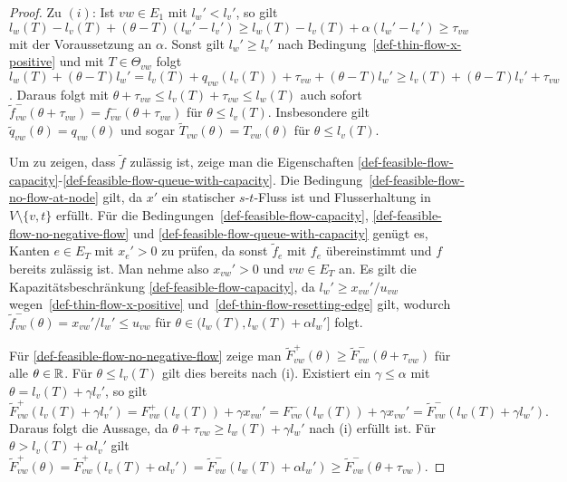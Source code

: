 \begin{proof}
	Zu $(i)$: Ist $vw\in E_1$ mit $l_w'<l_v'$, so gilt
	$l_w(T)-l_v(T) + (\theta - T)(l_w' - l_v') \geq l_w(T)-l_v(T)+\alpha(l_w'- l_v')\geq \tau_{vw}$  mit der Voraussetzung an $\alpha$.
	Sonst gilt $l_w' \geq l_v'$ nach Bedingung~\ref{def-thin-flow-x-positive} und mit $T\in \Theta_{vw}$ folgt $l_w(T)+(\theta-T)l_w'=l_v(T) + q_{vw}(l_v(T))+\tau_{vw}+(\theta - T)l_w' \geq l_v(T) + (\theta-T)l_v'+\tau_{vw}$.
	Daraus folgt mit $\theta + \tau_{vw} \leq l_v(T) + \tau_{vw} \leq l_w(T)$ auch sofort $\tilde{f}_{vw}^-(\theta + \tau_{vw}) = f_{vw}^-(\theta + \tau_{vw})$ für $\theta\leq l_v(T)$.
	Insbesondere gilt $\tilde{q}_{vw}(\theta) = q_{vw}(\theta)$ und sogar $ \tilde{T}_{vw}(\theta)= T_{vw}(\theta)$ für $\theta \leq l_v(T)$.
	
	Um zu zeigen, dass $\tilde{f}$ zulässig ist, zeige man die Eigenschaften \ref{def-feasible-flow-capacity}-\ref{def-feasible-flow-queue-with-capacity}.
	Die Bedingung~\ref{def-feasible-flow-no-flow-at-node} gilt, da $x'$ ein statischer $s$-$t$-Fluss ist und Flusserhaltung in $V\setminus \{ v, t \}$ erfüllt.
	Für die Bedingungen~\ref{def-feasible-flow-capacity}, \ref{def-feasible-flow-no-negative-flow} und \ref{def-feasible-flow-queue-with-capacity} genügt es, Kanten $e\in E_T$ mit $x_e' > 0$ zu prüfen, da sonst $\tilde{f}_e$ mit $f_e$ übereinstimmt und $f$ bereits zulässig ist.
	Man nehme also $x_{vw}' > 0$ und $vw\in E_T$ an.
	Es gilt die Kapazitätsbeschränkung \ref{def-feasible-flow-capacity}, da $l_w'\geq x_{vw}' / u_{vw}$ wegen~\ref{def-thin-flow-x-positive} und~\ref{def-thin-flow-resetting-edge} gilt, wodurch $\tilde{f}^-_{vw}(\theta)=x_{vw}'/l_w'\leq u_{vw}$ für $\theta\in(l_w(T), l_w(T)+\alpha l_w']$ folgt.
	
	Für \ref{def-feasible-flow-no-negative-flow} zeige man $\tilde{F}^+_{vw}(\theta)\geq \tilde{F}_{vw}^-(\theta+\tau_{vw})$ für alle $\theta\in\mathbb{R}$.
	Für $\theta\leq l_v(T)$ gilt dies bereits nach (i).
	Existiert ein $\gamma\leq\alpha$ mit $\theta=l_v(T) + \gamma l_v'$, so gilt
	\[
	\tilde{F}_{vw}^+(l_v(T) + \gamma l_v')=F_{vw}^+(l_v(T))+\gamma x_{vw}' = F_{vw}^-(l_w(T))+ \gamma x_{vw}'= \tilde{F}_{vw}^-(l_w(T)+\gamma l_w').
	\]
	Daraus folgt die Aussage, da $\theta + \tau_{vw}\geq l_w(T) + \gamma l_w'$ nach (i) erfüllt ist.
	Für $\theta > l_v(T)+\alpha l_v'$ gilt $\tilde{F}_{vw}^+(\theta) = \tilde{F}_{vw}^+(l_v(T) + \alpha l_v') = \tilde{F}_{vw}^-(l_w(T) + \alpha l_w') \geq \tilde{F}_{vw}^-(\theta + \tau_{vw})$.
	

\end{proof}
